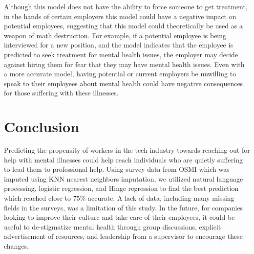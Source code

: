 \documentclass[times, twocolumn]{article}
\begin{document}
Although this model does not have the ability to force someone to get treatment,
in the hands of certain employers this model could have a negative impact on
potential employees, suggesting that this model could theoretically be used as a
weapon of math destruction. For example, if a potential employee is being interviewed
for a new position, and the model indicates that the employee is predicted to seek
treatment for mental health issues, the employer may decide against hiring them for
fear that they may have mental health issues. Even with a more accurate model, having
potential or current employers be unwilling to speak to their employees about mental
health could have negative consequences for those suffering with these illnesses.


\section{Conclusion}
Predicting the propensity of workers in the tech industry towards reaching out for
help with mental illnesses could help reach individuals who are quietly suffering
to lead them to professional help. Using survey data from OSMI which was imputed
using KNN nearest neighbors imputation, we utilized natural language processing,
logistic regression, and Hinge regression to find the best prediction which reached
close to 75\% accurate. A lack of data, including many missing fields in the surveys,
was a limitation of this study. In the future, for companies looking to improve their
culture and take care of their employees, it could be useful to de-stigmatize mental
health through group discussions, explicit advertisement of resources, and leadership
from a supervisor to encourage these changes.
\end{document}

